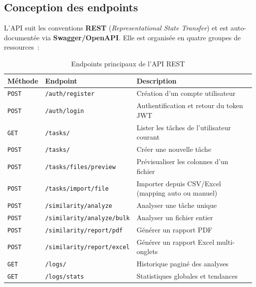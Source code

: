 \documentclass[12pt, a4paper]{article}
\begin{document}
\subsection{Conception des endpoints}

L'API suit les conventions \textbf{REST} (\textit{Representational State Transfer}) et est auto-documentée via \textbf{Swagger/OpenAPI}. Elle est organisée en quatre groupes de ressources~:

\begin{table}[H]
\centering
\caption{Endpoints principaux de l'API REST}
\begin{tabularx}{\textwidth}{llX}
\toprule
\rowcolor{tablehead}
\color{white}\textbf{Méthode} &
\color{white}\textbf{Endpoint} &
\color{white}\textbf{Description} \\
\midrule
\rowcolor{tablegray}
\texttt{POST} & \texttt{/auth/register}             & Création d'un compte utilisateur \\
\texttt{POST} & \texttt{/auth/login}                & Authentification et retour du token JWT \\
\rowcolor{tablegray}
\texttt{GET}  & \texttt{/tasks/}                    & Lister les tâches de l'utilisateur courant \\
\texttt{POST} & \texttt{/tasks/}                    & Créer une nouvelle tâche \\
\rowcolor{tablegray}
\texttt{POST} & \texttt{/tasks/files/preview}       & Prévisualiser les colonnes d'un fichier \\
\texttt{POST} & \texttt{/tasks/import/file}         & Importer depuis CSV/Excel (mapping auto ou manuel) \\
\rowcolor{tablegray}
\texttt{POST} & \texttt{/similarity/analyze}        & Analyser une tâche unique \\
\texttt{POST} & \texttt{/similarity/analyze/bulk}   & Analyser un fichier entier \\
\rowcolor{tablegray}
\texttt{POST} & \texttt{/similarity/report/pdf}     & Générer un rapport PDF \\
\texttt{POST} & \texttt{/similarity/report/excel}   & Générer un rapport Excel multi-onglets \\
\rowcolor{tablegray}
\texttt{GET}  & \texttt{/logs/}                     & Historique paginé des analyses \\
\texttt{GET}  & \texttt{/logs/stats}                & Statistiques globales et tendances \\
\bottomrule
\end{tabularx}
\end{table}
\end{document}

